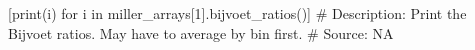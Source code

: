 [print(i) for i in miller_arrays[1].bijvoet_ratios()]
# Description:  Print the Bijvoet ratios.  May have to average by bin first.
# Source:  NA

